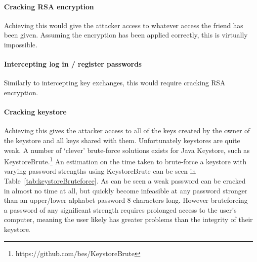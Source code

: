 \documentclass[12pt, titlepage]{article}
\begin{document}
\paragraph*{Cracking RSA encryption} Achieving this would give the attacker access to whatever access the friend has been given. Assuming the encryption has been applied correctly, this is virtually impossible.

\paragraph*{Intercepting log in / register passwords} Similarly to intercepting key exchanges, this would require cracking RSA encryption.

\paragraph*{Cracking keystore} Achieving this gives the attacker access to all of the keys created by the owner of the keystore and all keys shared with them. Unfortunately keystores are quite weak. A number of `clever' brute-force solutions exists for Java Keystore, such as KeystoreBrute.\footnote{https://github.com/bes/KeystoreBrute} An estimation on the time taken to brute-force a keystore with varying password strengths using KeystoreBrute can be seen in Table~\ref{tab:keystoreBruteforce}. As can be seen a weak password can be cracked in almost no time at all, but quickly become infeasible at any password stronger than an upper/lower alphabet password 8 characters long. However bruteforcing a password of any significant strength requires prolonged access to the user's computer, meaning the user likely has greater problems than the integrity of their keystore.
\end{document}
